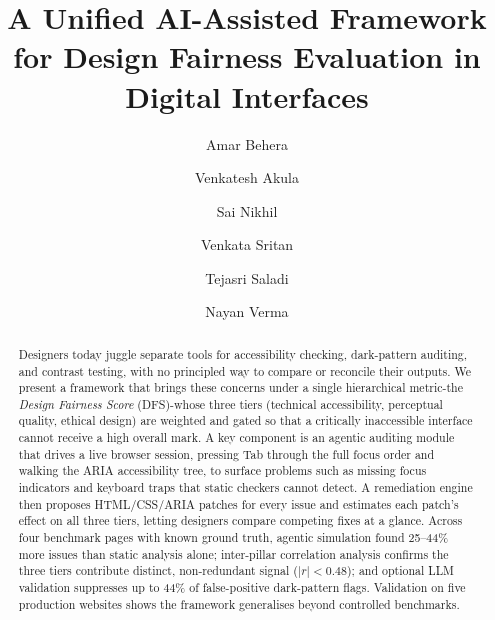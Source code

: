 \documentclass[runningheads]{llncs}
\begin{document}
\title{A Unified AI-Assisted Framework for Design Fairness Evaluation in Digital Interfaces}


\author{ Amar Behera \and 
Venkatesh Akula \and
Sai Nikhil \and
Venkata Sritan \and
Tejasri Saladi \and
Nayan Verma}



\maketitle

\begin{abstract}
Designers today juggle separate tools for accessibility checking, dark-pattern auditing, and contrast testing, with no principled way to compare or reconcile their outputs. We present a framework that brings these concerns under a single hierarchical metric-the \emph{Design Fairness Score} (DFS)-whose three tiers (technical accessibility, perceptual quality, ethical design) are weighted and gated so that a critically inaccessible interface cannot receive a high overall mark. A key component is an agentic auditing module that drives a live browser session, pressing Tab through the full focus order and walking the ARIA accessibility tree, to surface problems such as missing focus indicators and keyboard traps that static checkers cannot detect. A remediation engine then proposes HTML/CSS/ARIA patches for every issue and estimates each patch's effect on all three tiers, letting designers compare competing fixes at a glance. Across four benchmark pages with known ground truth, agentic simulation found 25--44\% more issues than static analysis alone; inter-pillar correlation analysis confirms the three tiers contribute distinct, non-redundant signal ($|r| < 0.48$); and optional LLM validation suppresses up to 44\% of false-positive dark-pattern flags. Validation on five production websites shows the framework generalises beyond controlled benchmarks.

\end{abstract}


\end{document}
